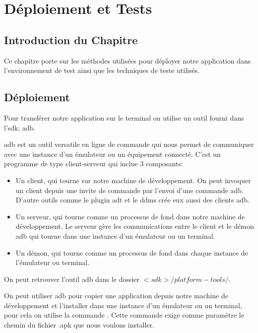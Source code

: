 
\chapter{Déploiement et Tests}

\section{Introduction du Chapitre}

Ce chapitre porte sur les méthodes utilisées pour déployer notre application dans l'environnement de test ainsi que les techniques de teste utilisés.

\section{Déploiement}

Pour transférer notre application sur le terminal \android{} on utilise un outil fourni dans l'\gls{sdk}: \gls{adb}.

\gls{adb}\cite{tools:adb} est un outil versatile en ligne de commande qui nous permet de communiquer avec une instance d'un émulateur ou un équipement \android{} connecté. C'est un programme de type client-serveur qui inclue 3 composants:

\begin{itemize}

\item Un client, qui tourne sur notre machine de développement. On peut invoquer
un client depuis une invite de commande par l’envoi d'une commande \gls{adb}.
D'autre outils \android{} comme le plugin \gls{adt} et le \gls{ddms} crée eux
aussi des clients \gls{adb}.

\item Un serveur, qui tourne comme un processus de fond dans notre machine de
développement. Le serveur gère les communications entre le client et le démon
\gls{adb} qui tourne dans une instance d'un émulateur ou un terminal.

\item Un démon, qui tourne comme un processus de fond dans chaque instance de l’émulateur ou terminal.

\end{itemize}

On peut retrouver l'outil \gls{adb} dans le dossier $<sdk>/platform-tools/$.

On peut utiliser \gls{adb} pour copier une application depuis notre machine de développement et l'installer dans une instance d'un émulateur ou un terminal, pour cela on utilise la commande . Cette commande exige comme paramètre le chemin du fichier .apk que nous voulons installer.


